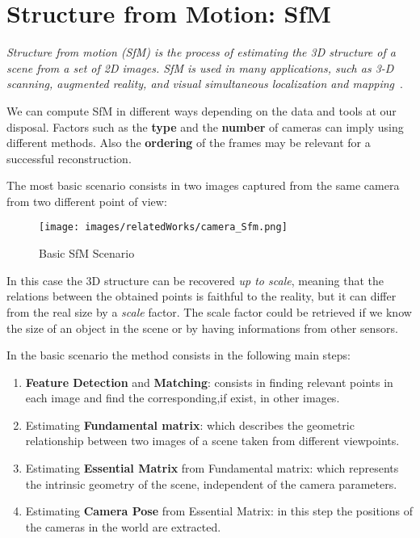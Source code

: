 \section{Structure from Motion: SfM}
\textit{Structure from motion (SfM) is the process of estimating the 3D
structure of a scene from a set of 2D images. SfM is used in many
applications, such as 3-D scanning, augmented reality, and visual
simultaneous localization and mapping}~\cite{sfm_matlab}.

We can compute SfM in different ways depending on the data and tools at our disposal.
Factors such as the \textbf{type} and the \textbf{number} of cameras can imply using different methods. Also 
the \textbf{ordering} of the frames may be relevant for a successful reconstruction.

The most basic scenario consists in two images captured from the same camera from two different point of view:
\begin{figure}[H]
    \centering
    \texttt{[image: images/relatedWorks/camera\_Sfm.png]} %
    \caption{Basic SfM Scenario}
    \label{fig:sfm_basic}
\end{figure}
 In this case the 3D structure can be recovered \textit{up to scale}, meaning that the relations between the obtained
 points is faithful to the reality, but it can differ from the real size by a \textit{scale} factor. The scale factor
 could be retrieved if we know the size of an object in the scene or by having informations from other sensors.

 In the basic scenario the method consists in the following main steps:
 \begin{enumerate}
    \item \textbf{Feature Detection} and \textbf{Matching}: consists in finding relevant points in each image and find the corresponding,if exist, in other images.
    \item Estimating \textbf{Fundamental matrix}: which describes the geometric relationship between two images of a scene taken from different viewpoints. 
    \item Estimating \textbf{Essential Matrix} from Fundamental matrix: which represents the intrinsic geometry of the scene, independent of the camera parameters.
    \item Estimating \textbf{Camera Pose} from Essential Matrix: in this step the positions of the cameras in the world are extracted.
 \end{enumerate}

